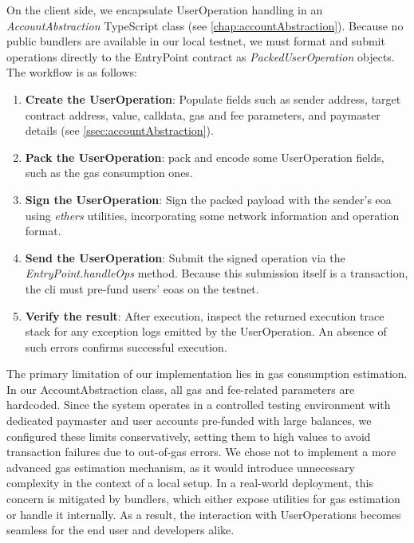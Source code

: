 On the client side, we encapsulate UserOperation handling in an \textit{AccountAbstraction} TypeScript class (see \cref{chap:accountAbstraction}). Because no public bundlers are available in our local testnet, we must format and submit operations directly to the EntryPoint contract as \textit{PackedUserOperation} objects. The workflow is as follows:
\begin{enumerate}
    \item \textbf{Create the UserOperation}: Populate fields such as sender address, target contract address, value, calldata, gas and fee parameters, and paymaster details (see \cref{ssec:accountAbstraction}).
    \item \textbf{Pack the UserOperation}: pack and encode some UserOperation fields, such as the gas consumption ones.
    \item \textbf{Sign the UserOperation}: Sign the packed payload with the sender's \acrshort{eoa} using \textit{ethers} utilities, incorporating some network information and operation format.
    \item \textbf{Send the UserOperation}: Submit the signed operation via the \textit{EntryPoint.handleOps} method. Because this submission itself is a transaction, the \acrshort{cli} must pre-fund users' \acrlong{eoa}s on the testnet. 
    \item \textbf{Verify the result}: After execution, inspect the returned execution trace stack for any exception logs emitted by the UserOperation. An absence of such errors confirms successful execution.
\end{enumerate}

The primary limitation of our implementation lies in gas consumption estimation. In our AccountAbstraction class, all gas and fee-related parameters are hardcoded. Since the system operates in a controlled testing environment with dedicated paymaster and user accounts pre-funded with large balances, we configured these limits conservatively, setting them to high values to avoid transaction failures due to out-of-gas errors.
We chose not to implement a more advanced gas estimation mechanism, as it would introduce unnecessary complexity in the context of a local setup. In a real-world deployment, this concern is mitigated by bundlers, which either expose utilities for gas estimation or handle it internally. As a result, the interaction with UserOperations becomes seamless for the end user and developers alike.

